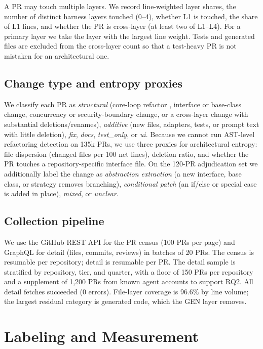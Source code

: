 \documentclass[sigconf,review]{acmart}
\begin{document}
A PR may touch multiple layers. We record line-weighted layer shares, the number of distinct harness layers touched (0--4), whether L1 is touched, the share of L1 lines, and whether the PR is cross-layer (at least two of L1--L4). For a primary layer we take the layer with the largest line weight. Tests and generated files are excluded from the cross-layer count so that a test-heavy PR is not mistaken for an architectural one.

\subsection{Change type and entropy proxies}

We classify each PR as \emph{structural} (core-loop refactor \citep{fowler2018}, interface or base-class change, concurrency or security-boundary change, or a cross-layer change with substantial deletions/renames), \emph{additive} (new files, adapters, tests, or prompt text with little deletion), \emph{fix}, \emph{docs}, \emph{test\_only}, or \emph{ui}. Because we cannot run AST-level refactoring detection \citep{tsantalis2022} on 135k PRs, we use three proxies for architectural entropy: file dispersion (changed files per 100 net lines), deletion ratio, and whether the PR touches a repository-specific interface file. On the 120-PR adjudication set we additionally label the change as \emph{abstraction extraction} (a new interface, base class, or strategy removes branching), \emph{conditional patch} (an if/else or special case is added in place), \emph{mixed}, or \emph{unclear}.

\subsection{Collection pipeline}

We use the GitHub REST API for the PR census (100 PRs per page) and GraphQL for detail (files, commits, reviews) in batches of 20 PRs. The census is resumable per repository; detail is resumable per PR. The detail sample is stratified by repository, tier, and quarter, with a floor of 150 PRs per repository and a supplement of 1,200 PRs from known agent accounts to support RQ2. All detail fetches succeeded (0 errors). File-layer coverage is 96.6\% by line volume; the largest residual category is generated code, which the GEN layer removes.

\section{Labeling and Measurement}
\label{sec:measurement}
\end{document}
